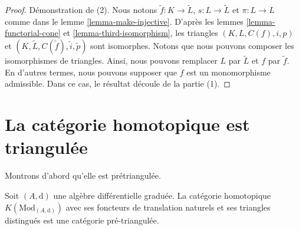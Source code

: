 \begin{proof}
\medskip\noindent
Démonstration de (2). Nous notons $\tilde f : K \to
\tilde L$, $s : L \to \tilde
L$ et $\pi : L \to L$ comme dans
le lemme \ref{lemma-make-injective}.
D'après les lemmes \ref{lemma-functorial-cone} et \ref{lemma-third-isomorphism},
les triangles $(K, L, C(f), i, p)$ et $(K,
\tilde L, C(\tilde f), \tilde i, \tilde p)$ sont isomorphes.
Notons que nous pouvons composer les isomorphismes de triangles.
Ainsi, nous pouvons remplacer $L$ par
$\tilde L$ et $f$ par $\tilde f$. En d'autres termes, nous
pouvons supposer que $f$ est un monomorphisme admissible. Dans ce
cas, le résultat découle de la partie (1).
\end{proof}







\section{La catégorie homotopique est triangulée}
\label{section-homotopy-triangulated}

\noindent
Montrons d'abord qu'elle est prétriangulée.

\begin{lemma}
\label{lemma-homotopy-category-pre-triangulated}
Soit $(A, \text{d})$ une algèbre différentielle graduée.
La catégorie homotopique $K(\text{Mod}_{(A, \text{d})})$
avec ses foncteurs de translation naturels et ses triangles distingués
est une catégorie pré-triangulée.
\end{lemma}

